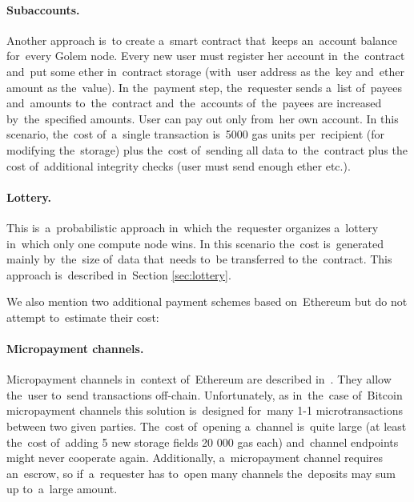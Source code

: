 \documentclass[a4paper]{article}
\begin{document}
    \paragraph{Subaccounts.}
    Another approach is~to create a~smart contract that~keeps an~account balance for~every Golem node.
    Every new user must register her account in~the~contract and~put some ether in~contract storage (with~user
    address as the~key and~ether amount as the~value). In the~payment step, the~requester sends a~list of~payees
    and~amounts to~the~contract and~the~accounts of~the~payees are increased by~the~specified amounts.
    User can pay out only from~her own account. In this scenario, the~cost of~a~single transaction is~5000 gas
    units per~recipient (for modifying the~storage) plus the~cost of~sending all data to~the~contract plus the
    cost of~additional integrity checks (user must send enough ether etc.).

    \paragraph{Lottery.} 
    This is~a~probabilistic approach in~which the~requester organizes a~lottery in~which only one compute node
    wins. In this scenario the~cost is~generated mainly by~the~size of~data that~needs to~be transferred to
    the~contract. This approach is~described in~Section \ref{sec:lottery}.

    We also mention two additional payment schemes based on~Ethereum but do not attempt to~estimate their cost:
    
    \paragraph{Micropayment channels.}
    Micropayment channels in~context of~Ethereum are described in~\cite{BUTERIN}. They allow the~user to~send
    transactions off-chain. Unfortunately, as in~the~case of~Bitcoin micropayment channels \cite{BITCOINJ} this
    solution is~designed for~many 1-1 microtransactions between two given parties. The~cost of~opening a~channel
    is~quite large (at least the~cost of~adding 5 new storage fields 20 000 gas each) and~channel endpoints might
    never cooperate again. Additionally, a~micropayment channel requires an~escrow, so if~a~requester has to~open
    many channels the~deposits may sum up to~a~large amount.
\end{document}
